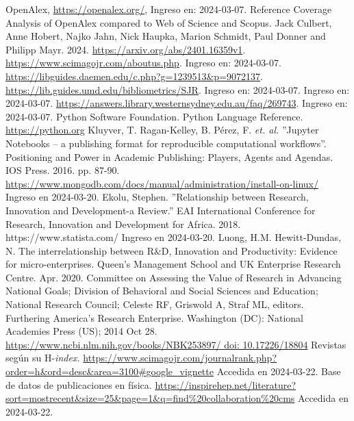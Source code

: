 \documentclass[
11pt, %
letter, %
oneside, %
]{article} %
\begin{document}
\begin{thebibliography}{10}
OpenAlex, \url{https://openalex.org/}, Ingreso en: 2024-03-07. 
	 Reference Coverage Analysis of OpenAlex compared to Web of Science and Scopus.  
Jack Culbert, Anne Hobert, Najko Jahn, Nick Haupka, Marion Schmidt, Paul Donner and Philipp Mayr. 2024. \url{https://arxiv.org/abs/2401.16359v1}. 
	 \url{https://www.scimagojr.com/aboutus.php}. Ingreso en: 2024-03-07.
	 \url{https://libguides.daemen.edu/c.php?g=1239513&p=9072137}. 
	 \url{https://lib.guides.umd.edu/bibliometrics/SJR}. Ingreso en: 2024-03-07.
	Ingreso en: 2024-03-07.
	 \url{https://answers.library.westernsydney.edu.au/faq/269743}. 	Ingreso en: 2024-03-07.
	  Python Software Foundation. Python Language Reference. \url{https://python.org}
	 Kluyver, T.  Ragan-Kelley, B. Pérez, F. \textit{et. al.} ''Jupyter Notebooks -- a publishing format for reproducible computational workflows''.  Positioning and Power in Academic Publishing: Players, Agents and Agendas. IOS Press. 2016. pp. 87-90.
	   \url{https://www.mongodb.com/docs/manual/administration/install-on-linux/} Ingreso en 2024-03-20.
	 Ekolu, Stephen. ''Relationship between Research, Innovation and Development-a Review.'' EAI International Conference for Research, Innovation and Development for Africa. 2018.
	 https://www.statista.com/ Ingreso en 2024-03-20.
	  Luong, H.M. Hewitt-Dundas, N. The interrelationship between R\&D, Innovation and Productivity:	Evidence for micro-enterprises.	Queen’s Management School and UK Enterprise 
	Research Centre. Apr. 2020. 
	 Committee on Assessing the Value of Research in Advancing National Goals; Division of Behavioral and Social Sciences and Education; National Research Council; Celeste RF, Griswold A, Straf ML, editors. Furthering America's Research Enterprise. Washington (DC): National Academies Press (US); 2014 Oct 28. \url{https://www.ncbi.nlm.nih.gov/books/NBK253897/ doi: 10.17226/18804}
	 Revistas según su H-\textit{index.} \url{https://www.scimagojr.com/journalrank.php?order=h&ord=desc&area=3100#google_vignette} Accedida en 2024-03-22.
	 Base de datos de publicaciones en física. \url{https://inspirehep.net/literature?sort=mostrecent&size=25&page=1&q=find%20collaboration%20cms} Accedida en 2024-03-22.
\end{thebibliography}
\end{document}
